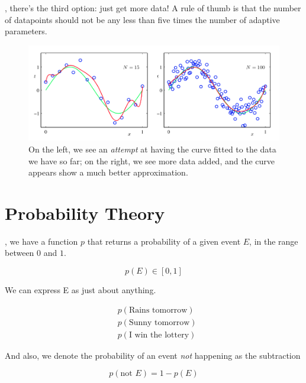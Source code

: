 \documentclass{tufte-handout}
\begin{document}
\break

, there's the third option: just get more data! A rule of thumb is that the number of datapoints should not be any less than five times the number of adaptive parameters.

\begin{figure}[h]
  \includegraphics[width=\linewidth]{moredata.png}%
  \caption{On the left, we see an \emph{attempt} at having the curve fitted to the data we have so far; on the right, we see more data added, and the curve appears show a much better approximation.}
\end{figure}

\break

\section{Probability Theory}

, we have a function $p$ that returns a probability of a given event $E$, in the range between $0$ and $1$.

\begin{equation}
  p(E) \in [0, 1]
\end{equation}

We can express E as just about anything.

\begin{align}
  & p(\text{Rains tomorrow}) \\
  & p(\text{Sunny tomorrow}) \\
  & p(\text{I win the lottery})
\end{align}

And also, we denote the probability of an event \emph{not} happening as the subtraction

\begin{equation} \label{equation:probabilitynot}
  p(\text{not } E) = 1 - p(E)
\end{equation}
\end{document}
